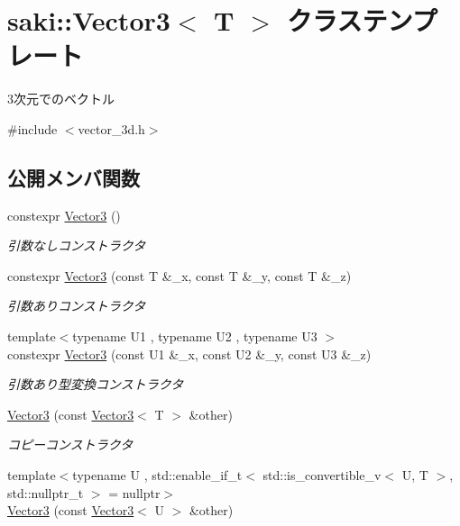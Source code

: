 \hypertarget{classsaki_1_1_vector3}{}\section{saki\+:\+:Vector3$<$ T $>$ クラステンプレート}
\label{classsaki_1_1_vector3}


3次元でのベクトル  




{\ttfamily \#include $<$vector\+\_\+3d.\+h$>$}

\subsection*{公開メンバ関数}
\begin{DoxyCompactItemize}
\item 
constexpr \mbox{\hyperlink{classsaki_1_1_vector3_a8617fe1a8d279c9673628728a0c5e5c6}{Vector3}} ()
\begin{DoxyCompactList}\small\item\em 引数なしコンストラクタ \end{DoxyCompactList}\item 
constexpr \mbox{\hyperlink{classsaki_1_1_vector3_abaf9038ebdc4895d7df1319b6234d790}{Vector3}} (const T \&\+\_\+x, const T \&\+\_\+y, const T \&\+\_\+z)
\begin{DoxyCompactList}\small\item\em 引数ありコンストラクタ \end{DoxyCompactList}\item 
{\footnotesize template$<$typename U1 , typename U2 , typename U3 $>$ }\\constexpr \mbox{\hyperlink{classsaki_1_1_vector3_abc7578100a27d5bfdd6e6eaa366b1fb9}{Vector3}} (const U1 \&\+\_\+x, const U2 \&\+\_\+y, const U3 \&\+\_\+z)
\begin{DoxyCompactList}\small\item\em 引数あり型変換コンストラクタ \end{DoxyCompactList}\item 
\mbox{\hyperlink{classsaki_1_1_vector3_a7399aa92e2792b33bd1c065adbf7b36b}{Vector3}} (const \mbox{\hyperlink{classsaki_1_1_vector3}{Vector3}}$<$ T $>$ \&other)
\begin{DoxyCompactList}\small\item\em コピーコンストラクタ \end{DoxyCompactList}\item 
{\footnotesize template$<$typename U , std\+::enable\+\_\+if\+\_\+t$<$ std\+::is\+\_\+convertible\+\_\+v$<$ U, T $>$, std\+::nullptr\+\_\+t $>$  = nullptr$>$ }\\\mbox{\hyperlink{classsaki_1_1_vector3_a4f7942875ebcc619f4594c0941645ad4}{Vector3}} (const \mbox{\hyperlink{classsaki_1_1_vector3}{Vector3}}$<$ U $>$ \&other)

\end{DoxyCompactItemize}
